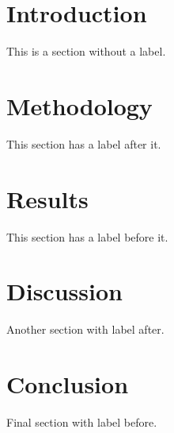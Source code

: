 \documentclass{article}
\begin{document}
\section{Introduction}
This is a section without a label.

\section{Methodology}
\label{sec:methodology}
This section has a label after it.

\label{sec:results}
\section{Results}
This section has a label before it.

\section{Discussion}

\label{sec:discussion}
Another section with label after.

  \label{sec:conclusion}

\section{Conclusion}
Final section with label before.
\end{document}
